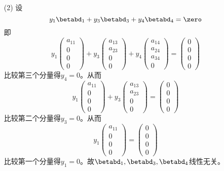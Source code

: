 \begin{itemize}
\item[(2)] 设
  $$
  y_1\betabd_1 + y_3\betabd_3 + y_4\betabd_4=\zero
  $$
  即
  $$
  y_1\left(
    \begin{array}{c}
      a_{11}\\
      0\\
      0\\
      0
    \end{array}
  \right) + y_3\left(
    \begin{array}{c}
      a_{13}\\
      a_{23}\\
      0\\
      0
    \end{array}
  \right) + y_4\left(
    \begin{array}{c}
      a_{14}\\
      a_{24}\\
      a_{34}\\
      0
    \end{array}
  \right) = \left(
    \begin{array}{c}
      0\\
      0\\
      0\\
      0
    \end{array}
  \right)
  $$
  比较第三个分量得$y_4=0$。从而
  $$
  y_1\left(
    \begin{array}{c}
      a_{11}\\
      0\\
      0\\
      0
    \end{array}
  \right) + y_3\left(
    \begin{array}{c}
      a_{13}\\
      a_{23}\\
      0\\
      0
    \end{array}
  \right) = \left(
    \begin{array}{c}
      0\\
      0\\
      0\\
      0
    \end{array}
  \right)
  $$比较第二个分量得$y_3=0$。从而
  $$
  y_1\left(
    \begin{array}{c}
      a_{11}\\
      0\\
      0\\
      0
    \end{array}
  \right) = \left(
    \begin{array}{c}
      0\\
      0\\
      0\\
      0
    \end{array}
  \right)
  $$ 比较第一个分量得$y_1=0$。故$\betabd_1,\betabd_3,\betabd_4$线性无关。
\end{itemize}





